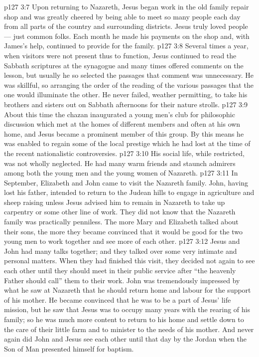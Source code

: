 \vs p127 3:7 \pc Upon returning to Nazareth, Jesus began work in the old family repair shop and was greatly cheered by being able to meet so many people each day from all parts of the country and surrounding districts. Jesus truly loved people --- just common folks. Each month he made his payments on the shop and, with James’s help, continued to provide for the family.
\vs p127 3:8 Several times a year, when visitors were not present thus to function, Jesus continued to read the Sabbath scriptures at the synagogue and many times offered comments on the lesson, but usually he so selected the passages that comment was unnecessary. He was skillful, so arranging the order of the reading of the various passages that the one would illuminate the other. He never failed, weather permitting, to take his brothers and sisters out on Sabbath afternoons for their nature strolls.
\vs p127 3:9 About this time the chazan inaugurated a young men’s club for philosophic discussion which met at the homes of different members and often at his own home, and Jesus became a prominent member of this group. By this means he was enabled to regain some of the local prestige which he had lost at the time of the recent nationalistic controversies.
\vs p127 3:10 His social life, while restricted, was not wholly neglected. He had many warm friends and staunch admirers among both the young men and the young women of Nazareth.
\vs p127 3:11 \pc In September, Elizabeth and John came to visit the Nazareth family. John, having lost his father, intended to return to the Judean hills to engage in agriculture and sheep raising unless Jesus advised him to remain in Nazareth to take up carpentry or some other line of work. They did not know that the Nazareth family was practically penniless. The more Mary and Elizabeth talked about their sons, the more they became convinced that it would be good for the two young men to work together and see more of each other.
\vs p127 3:12 Jesus and John had many talks together; and they talked over some very intimate and personal matters. When they had finished this visit, they decided not again to see each other until they should meet in their public service after “the heavenly Father should call” them to their work. John was tremendously impressed by what he saw at Nazareth that he should return home and labour for the support of his mother. He became convinced that he was to be a part of Jesus’ life mission, but he saw that Jesus was to occupy many years with the rearing of his family; so he was much more content to return to his home and settle down to the care of their little farm and to minister to the needs of his mother. And never again did John and Jesus see each other until that day by the Jordan when the Son of Man presented himself for baptism.
